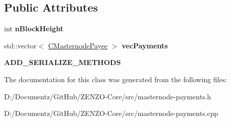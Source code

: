 \subsection*{Public Attributes}
\begin{DoxyCompactItemize}
\item 
\mbox{\label{class_c_masternode_block_payees_ae7eae4dd466c444d7c41debcbcc402f1}} 
int {\bfseries n\+Block\+Height}
\item 
\mbox{\label{class_c_masternode_block_payees_a8b68374c052c9f4508732943ccd4c17c}} 
std\+::vector$<$ \mbox{\hyperlink{class_c_masternode_payee}{C\+Masternode\+Payee}} $>$ {\bfseries vec\+Payments}
\item 
\mbox{\label{class_c_masternode_block_payees_ab596470ea981333cb3a905422c64eec1}} 
{\bfseries A\+D\+D\+\_\+\+S\+E\+R\+I\+A\+L\+I\+Z\+E\+\_\+\+M\+E\+T\+H\+O\+DS}
\end{DoxyCompactItemize}


The documentation for this class was generated from the following files\+:\begin{DoxyCompactItemize}
\item 
D\+:/\+Documentz/\+Git\+Hub/\+Z\+E\+N\+Z\+O-\/\+Core/src/masternode-\/payments.\+h\item 
D\+:/\+Documentz/\+Git\+Hub/\+Z\+E\+N\+Z\+O-\/\+Core/src/masternode-\/payments.\+cpp\end{DoxyCompactItemize}
